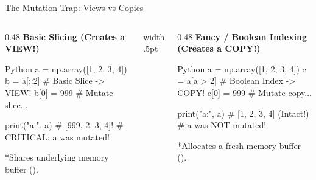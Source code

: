 \begin{frame}[fragile]{The Mutation Trap: Views vs Copies}
  \begin{columns}[T,onlytextwidth]
    \begin{column}{0.48\textwidth}
      {\small\bfseries\color{UpGradRed}Basic Slicing (Creates a VIEW!)}\par\vspace{0.08cm}
      \begin{CodeBlock}{Python}
a = np.array([1, 2, 3, 4])
b = a[::2]   # Basic Slice -> VIEW!
b[0] = 999   # Mutate slice...

print("a:", a) # [999, 2, 3, 4]!
# CRITICAL: a was mutated!
      \end{CodeBlock}
      \vspace{0.04cm}
      {\tiny\color{UpGradRedDark}*Shares underlying memory buffer ().}
    \end{column}
    \hfill{\color{UpGradRule}\vrule width .5pt}\hfill
    \begin{column}{0.48\textwidth}
      {\small\bfseries\color{AWSEmerald}Fancy / Boolean Indexing (Creates a COPY!)}\par\vspace{0.08cm}
      \begin{CodeBlock}{Python}
a = np.array([1, 2, 3, 4])
c = a[a > 2] # Boolean Index -> COPY!
c[0] = 999   # Mutate copy...

print("a:", a) # [1, 2, 3, 4] (Intact!)
# a was NOT mutated!
      \end{CodeBlock}
      \vspace{0.04cm}
      {\tiny\color{AWSEmerald}*Allocates a fresh memory buffer ().}
    \end{column}
  \end{columns}
  \vspace{0.18cm}
\end{frame}

